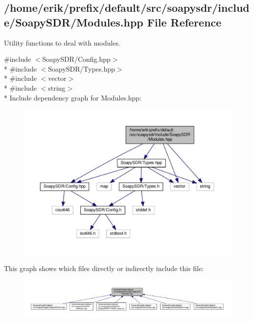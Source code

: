 \subsection{/home/erik/prefix/default/src/soapysdr/include/\+Soapy\+S\+D\+R/\+Modules.hpp File Reference}
\label{Modules_8hpp}


Utility functions to deal with modules.  


{\ttfamily \#include $<$Soapy\+S\+D\+R/\+Config.\+hpp$>$}\\*
{\ttfamily \#include $<$Soapy\+S\+D\+R/\+Types.\+hpp$>$}\\*
{\ttfamily \#include $<$vector$>$}\\*
{\ttfamily \#include $<$string$>$}\\*
Include dependency graph for Modules.\+hpp\+:
\nopagebreak
\begin{figure}[H]
\begin{center}
\leavevmode
\includegraphics[width=350pt]{db/dcf/Modules_8hpp__incl}
\end{center}
\end{figure}
This graph shows which files directly or indirectly include this file\+:
\nopagebreak
\begin{figure}[H]
\begin{center}
\leavevmode
\includegraphics[width=350pt]{d7/d7f/Modules_8hpp__dep__incl}
\end{center}
\end{figure}
